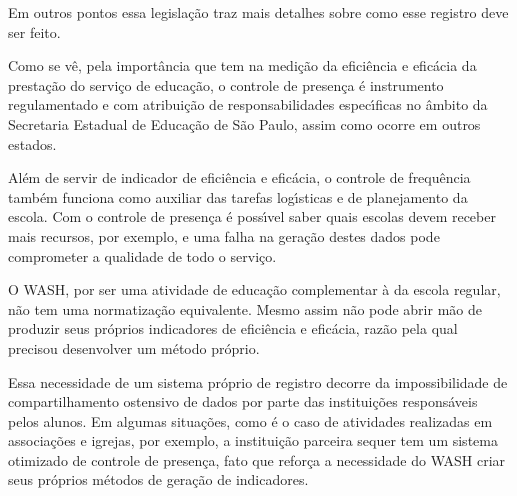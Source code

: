 \documentclass[
12pt,		%
openright,	%
twoside,  %
a4paper,			%
chapter=TITLE,		%
english,			%
french,				%
spanish,			%
brazil				%
]{USPSC-classe/USPSC}
\begin{document}
Em outros pontos essa legisla\c{c}\~ao traz mais detalhes sobre como esse registro deve ser feito.









Como se v\^e, pela import\^ancia que tem na medi\c{c}\~ao da efici\^encia e efic\'acia da presta\c{c}\~ao do servi\c{c}o de educa\c{c}\~ao, o controle de presen\c{c}a \'e instrumento regulamentado e com atribui\c{c}\~ao de responsabilidades espec\'{\i}ficas no \^ambito da Secretaria Estadual de Educa\c{c}\~ao de S\~ao Paulo, assim como ocorre em outros estados.









Al\'em de servir de indicador de efici\^encia e efic\'acia, o controle de frequ\^encia tamb\'em funciona como auxiliar das tarefas log\'{\i}sticas e de planejamento da escola. Com o controle de presen\c{c}a \'e poss\'{\i}vel saber quais escolas devem receber mais recursos, por exemplo, e uma falha na gera\c{c}\~ao destes dados pode comprometer a qualidade de todo o servi\c{c}o.









O WASH, por ser uma atividade de educa\c{c}\~ao complementar \`a da escola regular, n\~ao tem uma normatiza\c{c}\~ao equivalente. Mesmo assim n\~ao pode abrir m\~ao de produzir seus pr\'oprios indicadores de efici\^encia e efic\'acia, raz\~ao pela qual  precisou desenvolver um m\'etodo pr\'oprio.









Essa necessidade de um sistema pr\'oprio de registro decorre da impossibilidade de compartilhamento ostensivo de dados por parte das institui\c{c}\~oes respons\'aveis pelos alunos. Em algumas situa\c{c}\~oes, como \'e o caso de atividades realizadas em associa\c{c}\~oes e igrejas, por exemplo, a institui\c{c}\~ao parceira sequer tem um sistema otimizado de controle de presen\c{c}a, fato que refor\c{c}a a necessidade do WASH criar seus pr\'oprios m\'etodos de gera\c{c}\~ao de indicadores.
\end{document}
